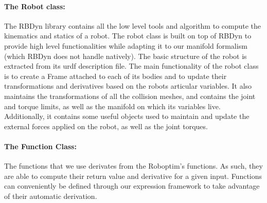 \paragraph{The Robot class:}
The RBDyn library contains all the low level tools and algorithm to compute the kinematics and statics of a robot.
The robot class is built on top of RBDyn to provide high level functionalities while adapting it to our manifold formalism (which RBDyn does not handle natively).
The basic structure of the robot is extracted from its urdf description file.
The main functionality of the robot class is to create a Frame attached to each of its bodies and to update their transformations and derivatives based on the robots articular variables.
It also maintains the transformations of all the collision meshes, and contains the joint and torque limits, as well as the manifold on which its variables live.
Additionally, it contains some useful objects used to maintain and update the external forces applied on the robot, as well as the joint torques.

\paragraph{The Function Class:}
The functions that we use derivates from the Roboptim's functions.
As such, they are able to compute their return value and derivative for a given input.
Functions can conveniently be defined through our expression framework to take advantage of their automatic derivation.

